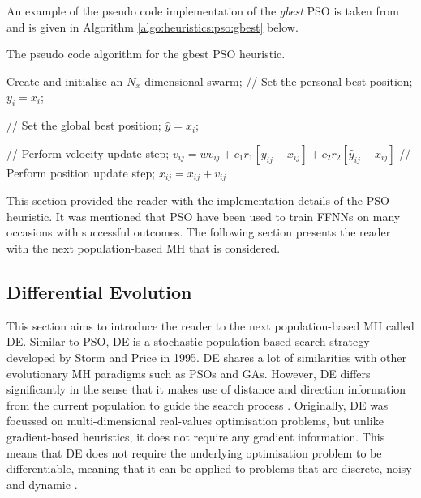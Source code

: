  An example of the pseudo code implementation of the \textit{gbest} \ac{PSO} is taken from \cite{ref:engelbrecht:2007} and is given in Algorithm \ref{algo:heuristics:pso:gbest} below.

\begin{algorithm}[H]
    \caption{The pseudo code algorithm for the gbest \ac{PSO} heuristic.}
    \label{algo:heuristics:pso:gbest}
    \begin{algorithmic}
        \State Create and initialise an $N_{x}$ dimensional swarm;
                \State // Set the personal best position;
                    \State $y_{i} = x_{i}$;
                \EndIf
                
                \State // Set the global best position;
                    \State $\hat{y} = x_{i}$;
                \EndIf
            \EndFor
            
                \State // Perform velocity update step;
                \State $v_{ij} = wv_{ij} + c_{1}r_{1}[y_{ij} - x_{ij}] + c_{2}r_{2}[\hat{y}_{ij} - x_{ij}]$
                \State // Perform position update step;
                \State $x_{ij} = x_{ij} + v_{ij}$
            \EndFor
        \EndWhile
    \end{algorithmic}
\end{algorithm}

This section provided the reader with the implementation details of the \ac{PSO} heuristic. It was mentioned that \ac{PSO} have been used to train \acp{FFNN} on many occasions with successful outcomes. The following section presents the reader with the next population-based \ac{MH} that is considered.

\subsection{Differential Evolution}
\label{sec:heuristics:mh:de}

This section aims to introduce the reader to the next population-based \ac{MH} called \acl{DE}. Similar to \ac{PSO}, \Ac{DE} is a stochastic population-based search strategy developed by Storm and Price \cite{ref:price:2006} in 1995. \Ac{DE} shares a lot of similarities with other evolutionary \ac{MH} paradigms such as \acp{PSO} and \acp{GA}. However, \ac{DE} differs significantly in the sense that it makes use of distance and direction information from the current population to guide the search process \cite{ref:engelbrecht:2007}. Originally, \ac{DE} was focussed on multi-dimensional real-values optimisation problems, but unlike gradient-based heuristics, it does not require any gradient information. This means that \ac{DE} does not require the underlying optimisation problem to be differentiable, meaning that it can be applied to problems that are discrete, noisy and dynamic \cite{ref:rocca:2011}.

